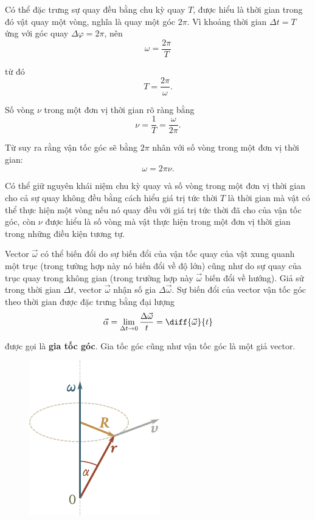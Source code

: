 Có thể đặc trưng sự quay đều bằng chu kỳ quay $T$, được hiểu là thời gian trong đó vật quay một vòng, nghĩa là quay một góc $2\pi$. Vì khoảng thời gian $\Delta t=T$ ứng với góc quay $\Delta\varphi=2\pi$, nên
\begin{equation}\label{eq:1_94}
\omega = \frac{2\pi}{T}
\end{equation}

\noindent
từ đó
\begin{equation}\label{eq:1_95}
T = \frac{2\pi}{\omega}.
\end{equation}

Số vòng $\nu$ trong một đơn vị thời gian rõ ràng bằng
\begin{equation}\label{eq:1_96}
\nu = \frac{1}{T} = \frac{\omega}{2\pi}.
\end{equation}

\noindent
Từ  suy ra rằng vận tốc góc sẽ bằng $2\pi$ nhân với số vòng trong một đơn vị thời gian:
\begin{equation}\label{eq:1_97}
\omega = 2\pi\nu.
\end{equation}

Có thể giữ nguyên khái niệm chu kỳ quay và số vòng trong một đơn vị thời gian cho cả sự quay không đều bằng cách hiểu giá trị tức thời $T$ là thời gian mà vật có thể thực hiện một vòng nếu nó quay đều với giá trị tức thời đã cho của vận tốc góc, còn $\nu$ được hiểu là số vòng mà vật thực hiện trong một đơn vị thời gian trong những điều kiện tương tự.

Vector $\vec{\omega}$ có thể biến đổi do sự biến đổi của vận tốc quay của vật xung quanh một trục (trong tường hợp này nó biến đổi về độ lớn) cũng như do sự quay của trục quay trong không gian (trong trường hợp này $\vec{\omega}$ biến đổi về hướng). Giả sử trong thời gian $\Delta t$, vector $\vec{\omega}$ nhận số gia $\Delta\vec{\omega}$. Sự biến đổi của vector vận tốc góc theo thời gian được đặc trưng bằng đại lượng
\begin{equation}\label{eq:1_98}
\vec{\alpha} = \lim_{\Delta t\to 0} \frac{\Delta\vec{\omega}}{t} = \diff{\vec{\omega}}{t}
\end{equation}

\noindent
được gọi là \textbf{gia tốc góc}. Gia tốc góc cũng như vận tốc góc là một giả vector.

\begin{figure}[!htb]
	\begin{center}
		\includegraphics[scale=1]{figures/ch_01/fig_1_33.pdf}
		\caption[]{}
		\label{fig:1_33}
	\end{center}
\end{figure}

